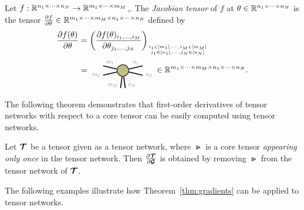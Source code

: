 \begin{definition}
 Let $f:\mathbb{R}^{n_1\times\dots\times n_N}\to\mathbb{R}^{m_1\times\dots\times m_M}$,. The \emph{Jacobian tensor} of $f$ at $\theta\in\mathbb{R}^{n_1\times\dots\times n_N}$ is the tensor $\frac{\partial f}{\partial\theta}\in\mathbb{R}^{m_1\times\dots\times m_M\times n_1\times\dots\times n_N}$
 defined by
\begin{align*}
   \frac{\partial f(\theta)}{\partial\theta} 
   &= 
   \left(\frac{\partial f(\theta)_{i_1,\dots,i_M}}{\partial\theta_{j_1,\dots,j_N}}\right)_{i_1\in[m_1],\cdots,i_M\in[m_M]\atop j_1\in[n_1],\cdots,j_N
\in[n_N]}\\
&=
\begin{tikzpicture}[baseline=-0.5ex]
    \tikzset{tensor/.style = {minimum size = 0.5cm,shape = circle,thick,draw=black,inner sep = 0pt}, edge/.style = {thick,line width=.4mm},every loop/.style={}}
    \def\x{6}
    \node[tensor,fill=green!50!red!50!white] (T) at (\x,0) {};
    \draw[edge] (T) -- (\x-0.85,0.2)node [midway, above]{\scalebox{0.7}{\dimcolor{$m_1$}}};
    \draw[edge] (T) -- (\x-0.85,-0.2)node [left]{\scalebox{0.7}{\dimcolor{$m_2$}}};
    \draw[edge] (T) -- (\x-0.1,-0.75)node [near end, left]{\scalebox{0.7}{\dimcolor{$m_M$}}};
    \draw[dotted] (\x-0.55,-0.3) -- (\x-0.2,-0.45);
    \draw[edge] (T) -- (\x+0.85,0.2)node [midway, above]{\scalebox{0.7}{\dimcolor{$n_1$}}};
    \draw[edge] (T) -- (\x+0.85,-0.2)node [right]{\scalebox{0.7}{\dimcolor{$n_2$}}};
    \draw[edge] (T) -- (\x+0.1,-0.75)node [near end, right]{\scalebox{0.7}{\dimcolor{$n_N$}}};
    \draw[dotted] (\x+0.55,-0.3) -- (\x+0.2,-0.45);
    \end{tikzpicture}\in\RR^{m_1\times\cdots\times m_M\times n_1\times\cdots\times n_N}. 
\end{align*}
\end{definition}




The following theorem demonstrates that first-order derivatives of tensor networks with respect to a core tensor can be easily computed using tensor networks.

\begin{theorem}\label{thm:gradients}
    Let $\bm{\mathcal{T}}$ be a tensor given as a tensor network, where $\Gt$ is a core tensor \emph{appearing only once} in the tensor network. Then $\frac{\partial \bm{\mathcal{T}}}{\partial \bm{\mathcal{G}}}$ is obtained by removing $\Gt$ from the tensor network of $\bm{\mathcal{T}}$. 
\end{theorem}
The following examples illustrate how Theorem~\ref{thm:gradients} can be applied to tensor networks.
